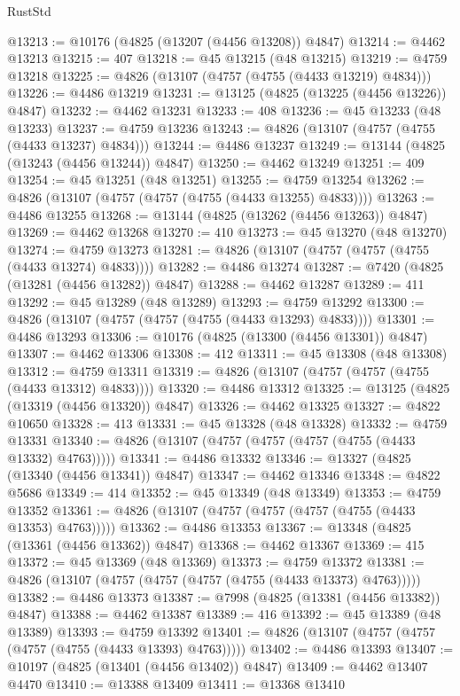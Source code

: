 \begin{lexlean}{RustStd}
\begin{coremodule}
@13213 := @10176 (@4825 (@13207 (@4456 @13208)) @4847)
@13214 := @4462 @13213
@13215 := 407
@13218 := @45 @13215 (@48 @13215)
@13219 := @4759 @13218
@13225 := @4826 (@13107 (@4757 (@4755 (@4433 @13219) @4834)))
@13226 := @4486 @13219
@13231 := @13125 (@4825 (@13225 (@4456 @13226)) @4847)
@13232 := @4462 @13231
@13233 := 408
@13236 := @45 @13233 (@48 @13233)
@13237 := @4759 @13236
@13243 := @4826 (@13107 (@4757 (@4755 (@4433 @13237) @4834)))
@13244 := @4486 @13237
@13249 := @13144 (@4825 (@13243 (@4456 @13244)) @4847)
@13250 := @4462 @13249
@13251 := 409
@13254 := @45 @13251 (@48 @13251)
@13255 := @4759 @13254
@13262 := @4826 (@13107 (@4757 (@4757 (@4755 (@4433 @13255) @4833))))
@13263 := @4486 @13255
@13268 := @13144 (@4825 (@13262 (@4456 @13263)) @4847)
@13269 := @4462 @13268
@13270 := 410
@13273 := @45 @13270 (@48 @13270)
@13274 := @4759 @13273
@13281 := @4826 (@13107 (@4757 (@4757 (@4755 (@4433 @13274) @4833))))
@13282 := @4486 @13274
@13287 := @7420 (@4825 (@13281 (@4456 @13282)) @4847)
@13288 := @4462 @13287
@13289 := 411
@13292 := @45 @13289 (@48 @13289)
@13293 := @4759 @13292
@13300 := @4826 (@13107 (@4757 (@4757 (@4755 (@4433 @13293) @4833))))
@13301 := @4486 @13293
@13306 := @10176 (@4825 (@13300 (@4456 @13301)) @4847)
@13307 := @4462 @13306
@13308 := 412
@13311 := @45 @13308 (@48 @13308)
@13312 := @4759 @13311
@13319 := @4826 (@13107 (@4757 (@4757 (@4755 (@4433 @13312) @4833))))
@13320 := @4486 @13312
@13325 := @13125 (@4825 (@13319 (@4456 @13320)) @4847)
@13326 := @4462 @13325
@13327 := @4822 @10650
@13328 := 413
@13331 := @45 @13328 (@48 @13328)
@13332 := @4759 @13331
@13340 := @4826 (@13107 (@4757 (@4757 (@4757 (@4755 (@4433 @13332) @4763)))))
@13341 := @4486 @13332
@13346 := @13327 (@4825 (@13340 (@4456 @13341)) @4847)
@13347 := @4462 @13346
@13348 := @4822 @5686
@13349 := 414
@13352 := @45 @13349 (@48 @13349)
@13353 := @4759 @13352
@13361 := @4826 (@13107 (@4757 (@4757 (@4757 (@4755 (@4433 @13353) @4763)))))
@13362 := @4486 @13353
@13367 := @13348 (@4825 (@13361 (@4456 @13362)) @4847)
@13368 := @4462 @13367
@13369 := 415
@13372 := @45 @13369 (@48 @13369)
@13373 := @4759 @13372
@13381 := @4826 (@13107 (@4757 (@4757 (@4757 (@4755 (@4433 @13373) @4763)))))
@13382 := @4486 @13373
@13387 := @7998 (@4825 (@13381 (@4456 @13382)) @4847)
@13388 := @4462 @13387
@13389 := 416
@13392 := @45 @13389 (@48 @13389)
@13393 := @4759 @13392
@13401 := @4826 (@13107 (@4757 (@4757 (@4757 (@4755 (@4433 @13393) @4763)))))
@13402 := @4486 @13393
@13407 := @10197 (@4825 (@13401 (@4456 @13402)) @4847)
@13409 := @4462 @13407 @4470
@13410 := @13388 @13409
@13411 := @13368 @13410

\end{coremodule}
\end{lexlean}
